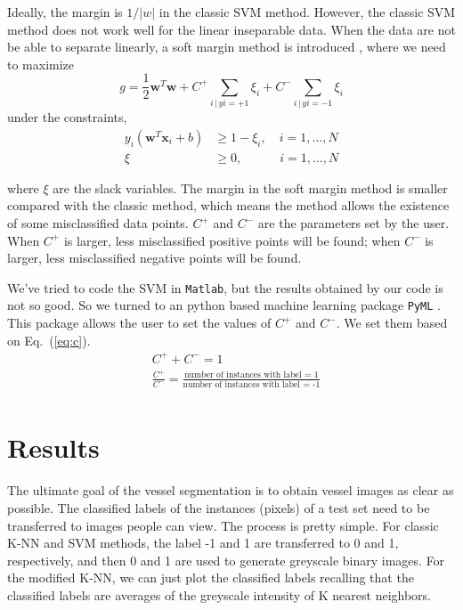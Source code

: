 \documentclass[12pt, notitlepage]{article}
\newcommand{\eqnref}[1]{Eq.~(\ref{#1})}
\begin{document}
Ideally, the margin is $1/|w|$ in the classic SVM method.  However, the classic SVM method does not work well for the linear inseparable data. When the data are not be able to separate linearly, a soft margin method is introduced \cite{veropoulos1999controlling, ricci2007retinal}, where we need to maximize 
\begin{equation}
g = \frac{1}{2}\boldsymbol{w}^T\boldsymbol{w} + C^+ \sum_{i \,|\, yi = +1} \xi_i + C^- \sum_{i \,|\, yi = -1} \xi_i
\end{equation}
under the constraints, 
\begin{equation}
\begin{aligned}
y_i(\boldsymbol{w}^T\boldsymbol{x}_i + b ) &\geq 1 - \xi_i, \quad i = 1,\ldots, N\\
\xi &\geq 0, \quad\quad\quad  i = 1,\ldots, N
\end{aligned}
\end{equation}

where $\xi$ are the slack variables.  The margin in the soft margin method is smaller compared with the classic method, which means the method allows the existence of some misclassified data points. $C^+$ and $C^-$ are the parameters set by the user. When $C^+$ is larger, less misclassified positive points will be found; when $C^-$ is larger, less misclassified negative points will be found. 

We've tried to code the SVM in \verb|Matlab|, but the results obtained by our code is not so good. So we turned to an python based machine learning package \verb|PyML| \cite{pyml}. This package allows the user to set the values of $C^+$ and $C^-$. We set them based on \eqnref{eq:c}.
\begin{equation}\label{eq:c}
\begin{aligned}
&C^+ + C^- = 1 \\
&\frac{C^+}{C^-} = \frac{\text{number of instances with label = 1}}{\text{number of instances with label = -1}}  \\
\end{aligned}
\end{equation}



\section{Results}

The ultimate goal of the vessel segmentation is to obtain vessel images as clear as possible.  The classified labels of the instances (pixels) of a test set need to be transferred to images people can view.  The process is pretty simple. For classic K-NN and SVM methods, the label -1 and 1 are transferred to 0 and 1, respectively, and then 0 and 1 are used to generate greyscale binary images.  For the modified K-NN, we can just plot the classified labels recalling that the classified labels are averages of the greyscale intensity of K nearest neighbors. 
\end{document}
